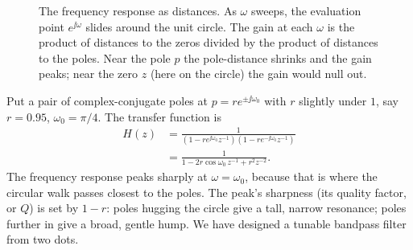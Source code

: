 \begin{figure}[H]
\centering
{}
\caption{The frequency response as distances. As $\omega$ sweeps, the evaluation point
$e^{\jj\omega}$ slides around the unit circle. The gain at each $\omega$ is the product of
distances to the zeros divided by the product of distances to the poles. Near the pole $p$
the pole-distance shrinks and the gain peaks; near the zero $z$ (here on the circle) the
gain would null out.}
\label{ch15:fig-rubber}
\end{figure}

\begin{example}
\label{ch15:ex-resonator}
Put a pair of complex-conjugate poles at $p = r e^{\pm\jj\omega_0}$ with $r$ slightly under
$1$, say $r=0.95$, $\omega_0 = \pi/4$. The transfer function is
\begin{align*}
  H(z) &= \frac{1}{(1 - re^{\jj\omega_0}z^{-1})(1 - re^{-\jj\omega_0}z^{-1})} \\
       &= \frac{1}{1 - 2r\cos\omega_0\, z^{-1} + r^2 z^{-2}}.
\end{align*}
The frequency response peaks sharply at $\omega=\omega_0$, because that is where the
circular walk passes closest to the poles. The peak's sharpness (its quality factor, or $Q$) is set by
$1-r$: poles hugging the circle give a tall, narrow resonance; poles further in give a
broad, gentle hump. We have designed a tunable bandpass filter from two dots.
\end{example}

